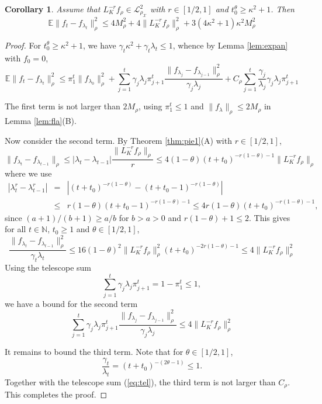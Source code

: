 \documentclass[twoside,11pt]{amsart}
\theoremstyle{theorem}
\newtheorem{cor}[thm]{Corollary}
\theoremstyle{definition}
\theoremstyle{remark}
\def\E{{\mathbb E}}        %
\def\L{{\mathscr L}}
\def\L2{{\mathscr L}^2_{\rho_\X}}
\def\M{M_\rho}
\def\X{{\mathscr X}}
\def\N{{\mathbb N}}
\def\t{t_0}
\def\la{\lambda}
\def\ka{\kappa}
\def\ga{\gamma}
\begin{document}
\begin{cor} \label{cor:rvarbnd}
Assume that $L_K^{-r}f_\rho \in \L2$ with $r\in [1/2,1]$ and $\t^\theta\geq \ka^2 +1$. Then 
\[ \E \|f_t - f_{\la_t}\|_\rho^2 \leq 4 \M^2 + 4\|L_K^{-r} f_\rho \|_\rho^2 + 3 (4\ka^2+1) \ka^2 \M^2 \]
\end{cor}

\begin{proof} For $\t^\theta\geq \ka^2 +1$, we have $\ga_t \ka^2 + \ga_t\la_t \leq 1$, whence by Lemma \ref{lem:expan} with $f_0=0$, 
\begin{equation} 
\E \|f_t - f_{\la_t}\|_\rho^2 \leq \pi_1^t \|f_{\la_0}\|_\rho^2 + \sum_{j=1}^t \ga_j \la_j \pi_{j+1}^t 
\frac{\|f_{\la_j}-f_{\la_{j-1}}\|_\rho^2}{\ga_j\la_j} +  C_\rho \sum_{j=1}^t \frac{\ga_j}{\la_j} \ga_j \la_j \pi_{j+1}^t
\end{equation}

The first term is not larger than $2\M$, using $\pi_1^t \leq 1$ and $\|f_{\la}\|_\rho \leq 2 \M$ in Lemma \ref{lem:fla}(B). 

Now consider the second term. By Theorem \ref{thm:pie1}(A) with $r\in [1/2,1]$,  
\[ \|f_{\la_t} - f_{\la_{t-1}} \|_\rho \leq |\la_{t} - \la_{t-1}| \frac{\|L_K^{-r} f_\rho \|_\rho}{r} \leq 4(1-\theta)(t+\t)^{-r(1-\theta)-1} \|L_K^{-r} f_\rho \|_\rho 
\]
where we use 
\begin{eqnarray*}
|\lambda_{t}^{r} - \lambda_{t-1}^{r} | & = & | (t+\t)^{-r(1-\theta)} - (t+\t-1)^{-r(1-\theta)}| \\
& \leq & r(1-\theta) (t+\t-1)^{-r(1-\theta)-1} \leq 4r(1-\theta) (t+\t)^{-r(1-\theta)-1},
\end{eqnarray*}
since $(a+1)/(b+1)\geq a/b$ for $b>a>0$ and $r(1-\theta)+1\leq 2$. This gives for all $t\in \N$, $\t\geq 1$ and $\theta\in [1/2,1]$, 
\[ \frac{\|f_{\la_t} - f_{\la_{t-1}}\|_\rho^2}{\ga_t \la_t} \leq 16(1-\theta)^2 \|L_K^{-r} f_\rho \|_\rho^2 (t+t_0)^{-2r(1-\theta)-1} \leq 
4\|L_K^{-r} f_\rho \|_\rho^2 \]
Using the telescope sum
\begin{equation} \label{eq:tel}
\sum_{j=1}^t \ga_j \la_j \pi_{j+1}^t = 1 - \pi_1^t \leq 1, 
\end{equation}
we have a bound for the second term
\[ \sum_{j=1}^t \ga_j \la_j \pi_{j+1}^t \frac{\|f_{\la_j}-f_{\la_{j-1}}\|_\rho^2}{\ga_j\la_j} \leq 4\|L_K^{-r} f_\rho \|_\rho^2 \]

It remains to bound the third term. Note that for $\theta\in [1/2,1]$,
$$ \frac{\ga_t}{\la_t} = (t+t_0)^{-(2\theta-1)} \leq 1. $$ 
Together with the telescope sum (\ref{eq:tel}), the third term is not larger than $C_\rho$. This completes the proof.
\end{proof}
\end{document}

